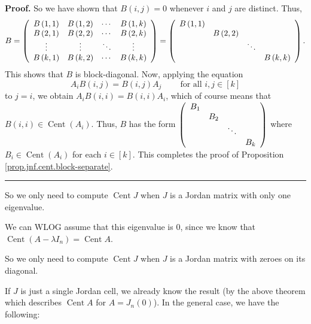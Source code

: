 \documentclass[numbers=enddot,12pt,final,onecolumn,notitlepage]{scrartcl}%
\numberwithin{exer}{subsection}
\theoremstyle{definition}
\newenvironment{proof}[1][Proof]{\noindent\textbf{#1.} }{\ \rule{0.5em}{0.5em}}
\begin{document}
\begin{proof}
So we have shown that $B\left(  i,j\right)  =0$ whenever $i$ and $j$ are
distinct. Thus,%
\[
B=\left(
\begin{array}
[c]{cccc}%
B\left(  1,1\right)  & B\left(  1,2\right)  & \cdots & B\left(  1,k\right) \\
B\left(  2,1\right)  & B\left(  2,2\right)  & \cdots & B\left(  2,k\right) \\
\vdots & \vdots & \ddots & \vdots\\
B\left(  k,1\right)  & B\left(  k,2\right)  & \cdots & B\left(  k,k\right)
\end{array}
\right)  =\left(
\begin{array}
[c]{cccc}%
B\left(  1,1\right)  &  &  & \\
& B\left(  2,2\right)  &  & \\
&  & \ddots & \\
&  &  & B\left(  k,k\right)
\end{array}
\right)  .
\]
This shows that $B$ is block-diagonal. Now, applying the equation%
\[
A_{i}B\left(  i,j\right)  =B\left(  i,j\right)  A_{j}%
\ \ \ \ \ \ \ \ \ \ \text{for all }i,j\in\left[  k\right]
\]
to $j=i$, we obtain $A_{i}B\left(  i,i\right)  =B\left(  i,i\right)  A_{i}$,
which of course means that $B\left(  i,i\right)  \in\operatorname*{Cent}%
\left(  A_{i}\right)  $. Thus, $B$ has the form $\left(
\begin{array}
[c]{cccc}%
B_{1} &  &  & \\
& B_{2} &  & \\
&  & \ddots & \\
&  &  & B_{k}%
\end{array}
\right)  $ where $B_{i}\in\operatorname*{Cent}\left(  A_{i}\right)  $ for each
$i\in\left[  k\right]  $. This completes the proof of Proposition
\ref{prop.jnf.cent.block-separate}.
\end{proof}

So we only need to compute $\operatorname*{Cent}J$ when $J$ is a Jordan matrix
with only one eigenvalue.

We can WLOG assume that this eigenvalue is $0$, since we know that
$\operatorname*{Cent}\left(  A-\lambda I_{n}\right)  =\operatorname*{Cent}A$.

So we only need to compute $\operatorname*{Cent}J$ when $J$ is a Jordan matrix
with zeroes on its diagonal.

If $J$ is just a single Jordan cell, we already know the result (by the above
theorem which describes $\operatorname*{Cent}A$ for $A=J_{n}\left(  0\right)
$). In the general case, we have the following:
\end{document}
